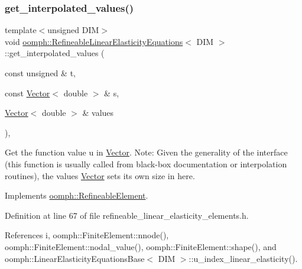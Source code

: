 \subsubsection{\texorpdfstring{get\+\_\+interpolated\+\_\+values()}{get\_interpolated\_values()}\hspace{0.1cm}{\footnotesize\ttfamily [1/2]}}
{\footnotesize\ttfamily template$<$unsigned D\+IM$>$ \\
void \hyperlink{classoomph_1_1RefineableLinearElasticityEquations}{oomph\+::\+Refineable\+Linear\+Elasticity\+Equations}$<$ D\+IM $>$\+::get\+\_\+interpolated\+\_\+values (\begin{DoxyParamCaption}\item[{const unsigned \&}]{t,  }\item[{const \hyperlink{classoomph_1_1Vector}{Vector}$<$ double $>$ \&}]{s,  }\item[{\hyperlink{classoomph_1_1Vector}{Vector}$<$ double $>$ \&}]{values }\end{DoxyParamCaption})\hspace{0.3cm}{\ttfamily [inline]}, {\ttfamily [virtual]}}



Get the function value u in \hyperlink{classoomph_1_1Vector}{Vector}. Note\+: Given the generality of the interface (this function is usually called from black-\/box documentation or interpolation routines), the values \hyperlink{classoomph_1_1Vector}{Vector} sets its own size in here. 



Implements \hyperlink{classoomph_1_1RefineableElement_ada6f0efe831ffefb1d2829ce01d45bfc}{oomph\+::\+Refineable\+Element}.



Definition at line 67 of file refineable\+\_\+linear\+\_\+elasticity\+\_\+elements.\+h.



References i, oomph\+::\+Finite\+Element\+::nnode(), oomph\+::\+Finite\+Element\+::nodal\+\_\+value(), oomph\+::\+Finite\+Element\+::shape(), and oomph\+::\+Linear\+Elasticity\+Equations\+Base$<$ D\+I\+M $>$\+::u\+\_\+index\+\_\+linear\+\_\+elasticity().

\mbox{\label{classoomph_1_1RefineableLinearElasticityEquations_acd2c98989ca38e1534ac70d5b4dc37a5}} 
